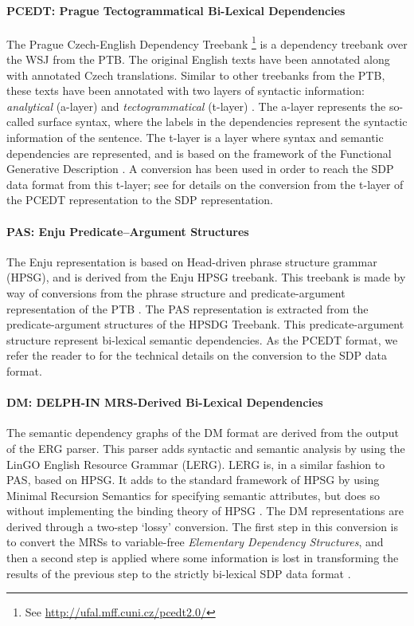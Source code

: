 \paragraph{PCEDT: Prague Tectogrammatical Bi-Lexical Dependencies} The Prague Czech-English Dependency Treebank \cite{PCEDT}\footnote{See \url{http://ufal.mff.cuni.cz/pcedt2.0/}} is a dependency treebank over the WSJ from the PTB. The original English texts have been annotated along with annotated Czech translations. Similar to other treebanks from the PTB, these texts have been annotated with two layers of syntactic information: \textit{analytical} (a-layer) and \textit{tectogrammatical} (t-layer) \cite{Oepen:14}. The a-layer represents the so-called surface syntax, where the labels in the dependencies represent the syntactic information of the sentence. The t-layer is a layer where syntax and semantic dependencies are represented, and is based on the framework of the Functional Generative Description \cite{Sgall:86}. A conversion has been used in order to reach the SDP data format from this t-layer; see  for details on the conversion from the t-layer of the PCEDT representation to the SDP representation.

\paragraph{PAS: Enju Predicate–Argument Structures} The Enju representation is based on Head-driven phrase structure grammar (HPSG), and is derived from the Enju HPSG treebank. This treebank is made by way of conversions from the phrase structure and predicate-argument representation of the PTB \cite{Oepen:14}. The PAS representation is extracted from the predicate-argument structures of the HPSDG Treebank. This predicate-argument structure represent bi-lexical semantic dependencies. As the PCEDT format, we refer the reader to  for the technical details on the conversion to the SDP data format.

\paragraph{DM: DELPH-IN MRS-Derived Bi-Lexical Dependencies} The semantic dependency graphs of the DM format are derived from the output of the ERG parser. This parser adds syntactic and semantic analysis by using the LinGO English Resource Grammar (LERG). LERG is, in a similar fashion to PAS, based on HPSG. It adds to the standard framework of HPSG by using Minimal Recursion Semantics for specifying semantic attributes, but does so without implementing the binding theory of HPSG \cite{Flickinger:00}. The DM representations are derived through a two-step `lossy' conversion. The first step in this conversion is to convert the MRSs to variable-free \textit{Elementary Dependency Structures}, and then a second step is applied where some information is lost in transforming the results of the previous step to the strictly bi-lexical SDP data format \cite{Miyao:14}.

